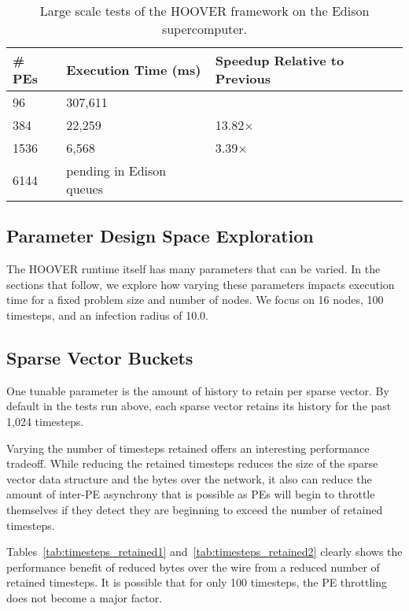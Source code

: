 \begin{table}
\centering
\begin{tabularx}{\textwidth}{ | X || X | X |}
\hline
    \textbf{\# PEs}             & \textbf{Execution Time (ms)} & \textbf{Speedup Relative to Previous} \\\hline
    96                          & 307,611 &               \\\hline
    384                         & 22,259  & 13.82$\times$ \\\hline
    1536                        & 6,568   & 3.39$\times$  \\\hline
    6144                        & pending in Edison queues    & \\\hline
\end{tabularx}
\caption{Large scale tests of the HOOVER framework on the Edison supercomputer.}
\label{tab:weak_scaling3}
\end{table}

\subsection{Parameter Design Space Exploration}

The HOOVER runtime itself has many parameters that can be varied. In the
sections that follow, we explore how varying these parameters impacts execution
time for a fixed problem size and number of nodes. We focus on 16 nodes, 100
timesteps, and an infection radius of 10.0.

\subsection{Sparse Vector Buckets}

One tunable parameter is the amount of history to retain per sparse vector. By
default in the tests run above, each sparse vector retains its history for the
past 1,024 timesteps.

Varying the number of timesteps retained offers an interesting performance
tradeoff. While reducing the retained timesteps reduces the size of the sparse
vector data structure and the bytes over the network, it also can reduce the amount
of inter-PE asynchrony that is possible as PEs will begin to throttle themselves
if they detect they are beginning to exceed the number of retained timesteps.

Tables~\ref{tab:timesteps_retained1} and~\ref{tab:timesteps_retained2} clearly shows the performance benefit of
reduced bytes over the wire from a reduced number of retained timesteps. It is
possible that for only 100 timesteps, the PE throttling does not become a major
factor.


